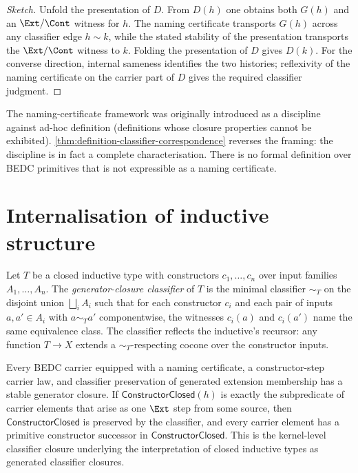 \begin{proof}[Sketch]
Unfold the presentation of $D$. From $D(h)$ one obtains both $G(h)$ and an $\Ext/\Cont$ witness for $h$. The naming certificate transports $G(h)$ across any classifier edge $h \sim k$, while the stated stability of the presentation transports the $\Ext/\Cont$ witness to $k$. Folding the presentation of $D$ gives $D(k)$. For the converse direction, internal sameness identifies the two histories; reflexivity of the naming certificate on the carrier part of $D$ gives the required classifier judgment.
\end{proof}

\begin{remark}
The naming-certificate framework was originally introduced as a discipline against ad-hoc definition (definitions whose closure properties cannot be exhibited). \autoref{thm:definition-classifier-correspondence} reverses the framing: the discipline is in fact a complete characterisation. There is no formal definition over BEDC primitives that is not expressible as a naming certificate.
\end{remark}

\section{Internalisation of inductive structure}
\label{sec:reflection-inductive-internalisation}

\begin{definition}
\label{def:generator-closure-classifier}
Let $T$ be a closed inductive type with constructors $c_1, \dots, c_n$ over input families $A_1, \dots, A_n$. The \emph{generator-closure classifier} of $T$ is the minimal classifier $\sim_T$ on the disjoint union $\bigsqcup_i A_i$ such that for each constructor $c_i$ and each pair of inputs $a, a' \in A_i$ with $a \sim_T a'$ componentwise, the witnesses $c_i(a)$ and $c_i(a')$ name the same equivalence class. The classifier reflects the inductive's recursor: any function $T \to X$ extends a $\sim_T$-respecting cocone over the constructor inputs.
\end{definition}

\begin{theorem}
\label{thm:inductive-as-classifier-closure}
Every BEDC carrier equipped with a naming certificate, a constructor-step carrier law, and classifier preservation of generated extension membership has a stable generator closure. If $\mathsf{ConstructorClosed}(h)$ is exactly the subpredicate of carrier elements that arise as one $\Ext$ step from some source, then $\mathsf{ConstructorClosed}$ is preserved by the classifier, and every carrier element has a primitive constructor successor in $\mathsf{ConstructorClosed}$. This is the kernel-level classifier closure underlying the interpretation of closed inductive types as generated classifier closures.
\end{theorem}

